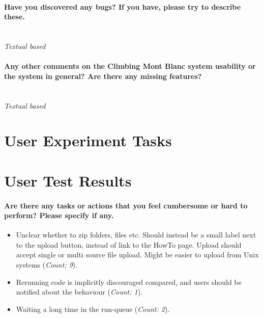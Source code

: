 \paragraph*{Have you discovered any bugs? If you have, please try to describe these.} \hfill \\
\textit{Textual based}

\paragraph*{Any other comments on the Climbing Mont Blanc system usability or the system in general? Are there any missing features?} \hfill \\
\textit{Textual based}

\section{User Experiment Tasks}


\section{User Test Results}
\paragraph*{Are there any tasks or actions that you feel cumbersome or hard to perform? Please specify if any.} \hfill
\begin{itemize}
  \item Unclear whether to zip folders, files etc. Should instead be a small label next to the upload button, instead of link to the HowTo page. Upload should accept single or multi source file upload. Might be easier to upload from Unix systems (\textit{Count: 9}).
  \item Rerunning code is implicitly discouraged compared, and users should be notified about the behaviour (\textit{Count: 1}).
  \item Waiting a long time in the run-queue (\textit{Count: 2}).
\end{itemize}

